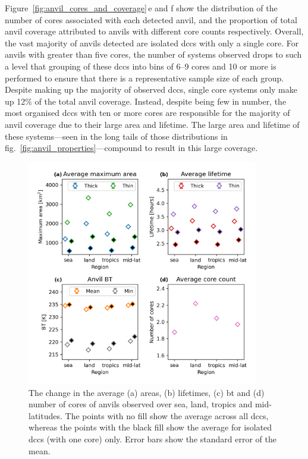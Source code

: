 Figure~\ref{fig:anvil_cores_and_coverage}\,e and f show the distribution of the number of cores associated with each detected anvil, and the proportion of total anvil coverage attributed to anvils with different core counts respectively.
Overall, the vast majority of anvils detected are isolated \acrshort{dcc}s with only a single core.
For anvils with greater than five cores, the number of systems observed drops to such a level that grouping of these \acrshort{dcc}s into bins of 6--9 cores and 10 or more is performed to ensure that there is a representative sample size of each group.
Despite making up the majority of observed \acrshort{dcc}s, single core systems only make up 12\% of the total anvil coverage.
Instead, despite being few in number, the most organised \acrshort{dcc}s with ten or more cores are responsible for the majority of anvil coverage due to their large area and lifetime.
The large area and lifetime of these systems---seen in the long tails of those distributions in fig.~\ref{fig:anvil_properties}---compound to result in this large coverage.

\begin{figure}[tp]
    \centering
    \includegraphics[width=0.9\textwidth]{figures/chapter2_22.png}
    \caption[
    The change in the average areas, lifetimes, \acrshort{bt} and number of cores of anvils observed over sea, land, tropics and mid-latitudes.
    ]{
    The change in the average (a) areas, (b) lifetimes, (c) \acrshort{bt} and (d) number of cores of anvils observed over sea, land, tropics and mid-latitudes. The points with no fill show the average across all \acrshort{dcc}s, whereas the points with the black fill show the average for isolated \acrshort{dcc}s (with one core) only. Error bars show the standard error of the mean.
    }
    \label{fig:anvil_properties_regions}
\end{figure}

